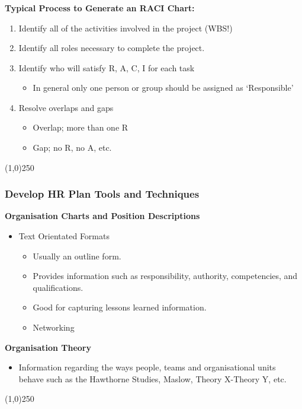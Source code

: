 \begin{frame}
\frametitle{}
\textbf{Typical Process to Generate an RACI Chart:}
\begin{enumerate}
	\item Identify all of the activities involved in the project (WBS!)
	\item Identify all roles necessary to complete the project.
	\item Identify who will satisfy R, A, C, I for each task
		\begin{itemize}
			\item In general only one person or group should be assigned as `Responsible'
		\end{itemize}
	\item Resolve overlaps and gaps
		\begin{itemize}
			\item Overlap; more than one R
			\item Gap; no R, no A, etc.
		\end{itemize}
\end{enumerate}	
\end{frame}\begin{center}\line(1,0){250}\end{center}
 
 
\begin{frame}
\frametitle{Develop HR Plan \hfill Tools and Techniques}
\textbf{Organisation Charts and Position Descriptions}
\begin{itemize}
	\item Text Orientated Formats
			\begin{itemize}
				\item Usually an outline form.
				\item Provides information such as responsibility, authority, competencies, and qualifications.
				\item Good for capturing lessons learned information.
				\item Networking
			\end{itemize}
\end{itemize}
\textbf{Organisation Theory}
		\begin{itemize}
			\item Information regarding the ways people, teams and organisational units behave such as the Hawthorne Studies, Maslow, Theory X-Theory Y, etc.
		\end{itemize}
\end{frame}\begin{center}\line(1,0){250}\end{center}
 
